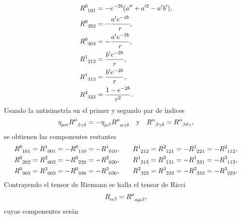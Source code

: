 \begin{align*}
        \tensor{R}{^0_1_0_1} &= -e^{-2b}(a^{\prime\prime}+a^{\prime 2}-a^\prime b^\prime), \\
        \tensor{R}{^0_2_0_2} &= -\frac{a^\prime e^{-2b}}{r}, \\ 
        \tensor{R}{^0_3_0_3} &= -\frac{a^\prime e^{-2b}}{r}, \\
        \tensor{R}{^1_2_1_2} &= \frac{b^\prime e^{-2b}}{r}, \\
        \tensor{R}{^1_3_1_3} &= \frac{b^\prime e^{-2b}}{r}, \\
        \tensor{R}{^2_3_2_3} &= \frac{1-e^{-2b}}{r^2}.
\end{align*}
Usando la antisimetría en el primer y segundo par de índices
\begin{equation}
    \tensor{\eta}{_\mu_\alpha}\tensor{R}{^\mu_\beta_\gamma_\delta}=-\tensor{\eta}{_\mu_\beta}\tensor{R}{^\mu_\alpha_\gamma_\delta}\quad \text{y} \quad \tensor{R}{^\alpha_\beta_\gamma_\delta}=\tensor{R}{^\alpha_\beta_\delta_\gamma},
\end{equation}
se obtienen las componentes restantes
\begin{equation}
    \begin{split}
    \tensor{R}{^0_1_0_1} &= \tensor{R}{^1_0_0_1} = -\tensor{R}{^0_1_1_0} = -\tensor{R}{^1_0_1_0}, \\
    \tensor{R}{^0_2_0_2} &=  \tensor{R}{^2_0_0_2} = - \tensor{R}{^0_2_2_0} = - \tensor{R}{^2_0_2_0}, \\
    \tensor{R}{^0_3_0_3} &= \tensor{R}{^3_0_0_3} = -\tensor{R}{^0_3_3_0}=-\tensor{R}{^3_0_3_0},
    \end{split}
    \qquad
    \begin{split}
    \tensor{R}{^1_2_1_2} &= \tensor{R}{^2_1_2_1} = -\tensor{R}{^1_2_2_1}=-\tensor{R}{^2_1_1_2}, \\
    \tensor{R}{^1_3_1_3} &= \tensor{R}{^3_1_3_1} = -\tensor{R}{^1_3_3_1} = -\tensor{R}{^3_1_1_3}, \\
    \tensor{R}{^2_3_2_3} &= \tensor{R}{^3_2_3_2} = -\tensor{R}{^2_3_3_2} = -\tensor{R}{^3_2_2_3}.
    \end{split}
\end{equation}
Contrayendo el tensor de Riemann se halla el tensor de Ricci
\begin{equation}
    \tensor{R}{_\alpha_\beta}=\tensor{R}{^\mu_\alpha_\mu_\beta},
\end{equation}
cuyas componentes serán
